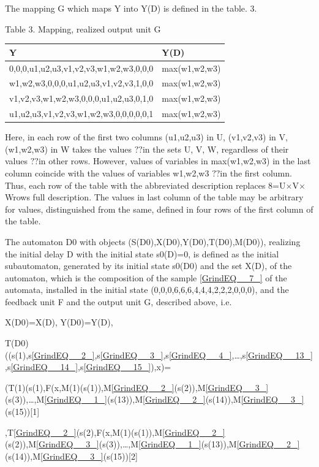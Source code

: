 \documentclass{article}
\begin{document}
The mapping G which maps Y into Y(D) is defined in the table. 3.

Table 3. Mapping, realized output unit G

\begin{tabular}{|p{1.5in}|p{0.7in}|} \hline
Y & Y(D) \\ \hline
0,0,0,u1,u2,u3,v1,v2,v3,w1,w2,w3,0,0,0 & max(w1,w2,w3) \\ \hline
w1,w2,w3,0,0,0,u1,u2,u3,v1,v2,v3,1,0,0 & max(w1,w2,w3) \\ \hline
v1,v2,v3,w1,w2,w3,0,0,0,u1,u2,u3,0,1,0 & max(w1,w2,w3) \\ \hline
u1,u2,u3,v1,v2,v3,w1,w2,w3,0,0,0,0,0,1 & max(w1,w2,w3) \\ \hline
\end{tabular}

Here, in each row of the first two columns (u1,u2,u3) in U, (v1,v2,v3) in V, (w1,w2,w3) in W takes the values $?$$?$in the sets U, V, W, regardless of their values $?$$?$in other rows. However, values of variables in max(w1,w2,w3) in the last column coincide with the values of variables w1,w2,w3 $?$$?$in the first column. Thus, each row of the table with the abbreviated description replaces 8=\textbar U\textbar $\times$\textbar V\textbar $\times$\textbar W\textbar  rows full description. The values in last column of the table may be arbitrary for values, distinguished from the same, defined in four rows of the first column of the table.

The  automaton D0 with objects (S(D0),X(D0),Y(D0),T(D0),M(D0)), realizing the initial delay D with the initial state s0(D)=0, is defined as the initial subautomaton, generated by its initial state s0(D0) and the set X(D), of the automaton, which is the composition of the sample \eqref{GrindEQ__7_} of the automata, installed in the initial state (0,0,0,6,6,6,4,4,4,2,2,2,0,0,0), and the feedback unit F and the output unit G, described above, i.e.

X(D0)=X(D), Y(D0)=Y(D),

T(D0)((s(1),s\eqref{GrindEQ__2_},s\eqref{GrindEQ__3_},s\eqref{GrindEQ__4_},\dots ,s\eqref{GrindEQ__13_},s\eqref{GrindEQ__14_},s\eqref{GrindEQ__15_}),x)=

(T(1)(s(1),F(x,M(1)(s(1)),M\eqref{GrindEQ__2_}(s(2)),M\eqref{GrindEQ__3_}(s(3)),\dots ,M\eqref{GrindEQ__1_}(s(13)),M\eqref{GrindEQ__2_}(s(14)),M\eqref{GrindEQ__3_}(s(15))[1]

,T\eqref{GrindEQ__2_}(s(2),F(x,M(1)(s(1)),M\eqref{GrindEQ__2_}(s(2)),M\eqref{GrindEQ__3_}(s(3)),\dots ,M\eqref{GrindEQ__1_}(s(13)),M\eqref{GrindEQ__2_}(s(14)),M\eqref{GrindEQ__3_}(s(15))[2]
\end{document}
